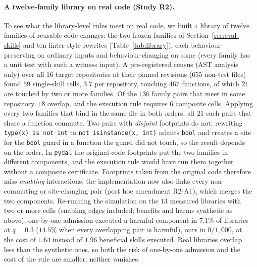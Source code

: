 \paragraph{A twelve-family library on real code (Study R2).}
To see what the library-level rules meet on real code, we built a library of twelve families of reusable code changes: the two frozen
families of Section~\ref{sec:eval-skills} and ten linter-style rewrites (Table~\ref{tab:library}), each behaviour-preserving on
ordinary inputs and behaviour-changing on some (every family has a unit test with such a witness input).  A pre-registered census
(AST analysis only) over all $16$ target repositories at their pinned revisions ($655$ non-test files) found $59$ single-skill cells,
$3.7$ per repository, touching $467$ functions, of which $21$ are touched by two or more families.  Of the $136$ family pairs that
meet in some repository, $18$ overlap, and the execution rule requires $6$ composite cells.
Applying every two families that bind in the same file in both orders, all $21$ such pairs that share a function commute.  Two pairs
with \emph{disjoint} footprints do not: rewriting \texttt{type(x) is not int} to \texttt{not isinstance(x, int)} admits \texttt{bool}
and creates a site for the \texttt{bool} guard in a function the guard did not touch, so the result depends on the order.  In
\texttt{pydal} the original-code footprints put the two families in different components, and the execution rule would have run them
together without a composite certificate.  Footprints taken from the original code therefore miss \emph{enabling} interactions; the
implementation now also links every non-commuting or site-changing pair (post hoc amendment R2-A1), which merges the two
components.  Re-running the simulation on the $13$ measured libraries with two or more cells (enabling edges included; benefits and
harms synthetic as above), one-by-one admission executed a harmful component in $7.1\%$ of libraries at $q=0.3$ ($14.5\%$ when every
overlapping pair is harmful), ours in $0/1{,}000$, at the cost of $1.64$ instead of $1.96$ beneficial skills executed.  Real libraries
overlap less than the synthetic ones, so both the risk of one-by-one admission and the cost of the rule are smaller; neither vanishes.

